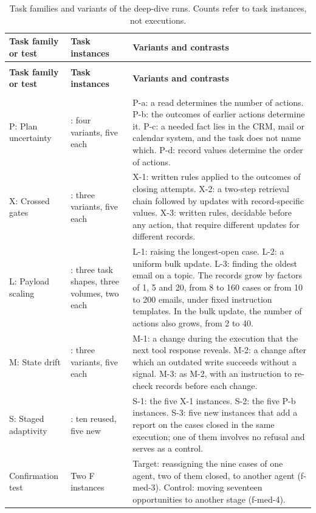 \begingroup
\renewcommand{\baselinestretch}{1}
\small
\setlength{\tabcolsep}{4pt}
\renewcommand{\arraystretch}{1.08}
\begin{longtable}{>{\raggedright\arraybackslash}p{} >{\raggedright\arraybackslash}p{} >{\raggedright\arraybackslash}p{}}
\caption[Task families and variants of the deep-dive runs]{Task families and variants of the deep-dive runs. Counts refer to task instances, not executions.}\label{tab:app-deepdive-design} \\
\toprule
\textbf{Task family or test} & \textbf{Task instances} & \textbf{Variants and contrasts} \\
\midrule
\endfirsthead
\multicolumn{3}{l}{\tablename~\thetable{} (continued)} \\
\toprule
\textbf{Task family or test} & \textbf{Task instances} & \textbf{Variants and contrasts} \\
\midrule
\endhead
\midrule
\multicolumn{3}{r}{\emph{Continued on the next page.}} \\
\endfoot
\bottomrule
\endlastfoot
P: Plan uncertainty & 20: four variants, five each & P-a: a read determines the number of actions. P-b: the outcomes of earlier actions determine it. P-c: a needed fact lies in the CRM, mail or calendar system, and the task does not name which. P-d: record values determine the order of actions. \\
\addlinespace[2.5pt]
X: Crossed gates & 15: three variants, five each & X-1: written rules applied to the outcomes of closing attempts. X-2: a two-step retrieval chain followed by updates with record-specific values. X-3: written rules, decidable before any action, that require different updates for different records. \\
\addlinespace[2.5pt]
L: Payload scaling & 18: three task shapes, three volumes, two each & L-1: raising the longest-open case. L-2: a uniform bulk update. L-3: finding the oldest email on a topic. The records grow by factors of 1, 5 and 20, from 8 to 160 cases or from 10 to 200 emails, under fixed instruction templates. In the bulk update, the number of actions also grows, from 2 to 40. \\
\addlinespace[2.5pt]
M: State drift & 15: three variants, five each & M-1: a change during the execution that the next tool response reveals. M-2: a change after which an outdated write succeeds without a signal. M-3: as M-2, with an instruction to re-check records before each change. \\
\addlinespace[2.5pt]
S: Staged adaptivity & 15: ten reused, five new & S-1: the five X-1 instances. S-2: the five P-b instances. S-3: five new instances that add a report on the cases closed in the same execution; one of them involves no refusal and serves as a control. \\
\addlinespace[2.5pt]
Confirmation test & Two F instances & Target: reassigning the nine cases of one agent, two of them closed, to another agent (f-med-3). Control: moving seventeen opportunities to another stage (f-med-4). \\
\end{longtable}
\endgroup

